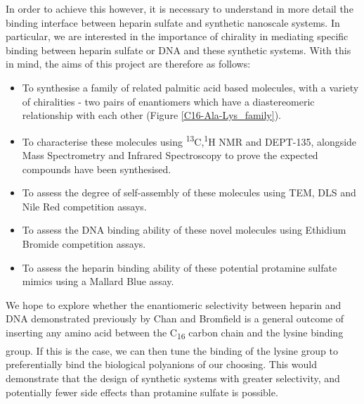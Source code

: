 In order to achieve this however, it is necessary to understand in more detail the binding interface between heparin sulfate and synthetic nanoscale systems. In particular, we are interested in the importance of chirality in mediating specific binding between heparin sulfate or DNA and these synthetic systems. With this in mind, the aims of this project are therefore as follows:
\begin{itemize}
\item To synthesise a family of related palmitic acid based molecules, with a variety of chiralities - two pairs of enantiomers which have a diastereomeric relationship with each other (Figure \ref{C16-Ala-Lys_family}). 
\item To characterise these molecules using \textsuperscript{13}C,\textsuperscript{1}H NMR and DEPT-135, alongside Mass Spectrometry and Infrared Spectroscopy to prove the expected compounds have been synthesised. 
\item To assess the degree of self-assembly of these molecules using TEM, DLS and Nile Red competition assays.
\item To assess the DNA binding ability of these novel molecules using Ethidium Bromide competition assays. 
\item To assess the heparin binding ability of these potential protamine sulfate mimics using a Mallard Blue assay. 
\end{itemize} 

We hope to explore whether the enantiomeric selectivity between heparin and DNA demonstrated previously by Chan and Bromfield is a general outcome of inserting any amino acid between the C\textsubscript{16} carbon chain and the lysine binding group.\textsuperscript{\cite{Bromfield2015HeparinNanostructures,Chan2016ChiralBinding}} If this is the case, we can then tune the binding of the lysine group to preferentially bind the biological polyanions of our choosing. This would demonstrate that the design of synthetic systems with greater selectivity, and potentially fewer side effects than protamine sulfate is possible. 
